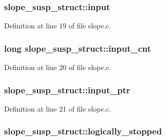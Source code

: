 \subsubsection[{\texorpdfstring{input}{input}}]{ slope\+\_\+susp\+\_\+struct\+::input}\hypertarget{structslope__susp__struct_af7ffbcda3e6d0aade1db241dc8d1de09}{}\label{structslope__susp__struct_af7ffbcda3e6d0aade1db241dc8d1de09}


Definition at line 19 of file slope.\+c.

\subsubsection[{\texorpdfstring{input\+\_\+cnt}{input_cnt}}]{\setlength{\rightskip}{0pt plus 5cm}long slope\+\_\+susp\+\_\+struct\+::input\+\_\+cnt}\hypertarget{structslope__susp__struct_abe886adf128d206b62abc4fe7a47767d}{}\label{structslope__susp__struct_abe886adf128d206b62abc4fe7a47767d}


Definition at line 20 of file slope.\+c.

\subsubsection[{\texorpdfstring{input\+\_\+ptr}{input_ptr}}]{ slope\+\_\+susp\+\_\+struct\+::input\+\_\+ptr}\hypertarget{structslope__susp__struct_ad6c0373c47fd81fcd221db156dc95c12}{}\label{structslope__susp__struct_ad6c0373c47fd81fcd221db156dc95c12}


Definition at line 21 of file slope.\+c.

\subsubsection[{\texorpdfstring{logically\+\_\+stopped}{logically_stopped}}]{ slope\+\_\+susp\+\_\+struct\+::logically\+\_\+stopped}\hypertarget{structslope__susp__struct_aa7b04c197e05cf39e81b3b0339e935a1}{}\label{structslope__susp__struct_aa7b04c197e05cf39e81b3b0339e935a1}



